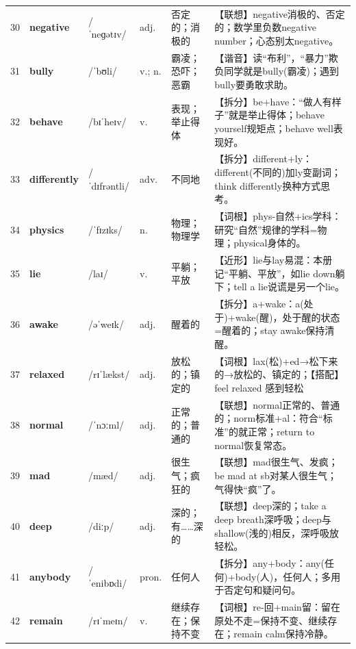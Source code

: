 \documentclass[UTF8,a4paper,11pt,oneside]{ctexbook}
\newcommand{\cellword}[1]{{\bfseries\textcolor{wordcol}{#1}}}
\newcommand{\cellipa}[1]{{\footnotesize\textcolor{ipacol}{#1}}}
\newcommand{\cellpos}[1]{\textcolor{poscol}{#1}}
\newcommand{\cellno}[1]{\textcolor{volcolor!75!black}{#1}}
\begin{document}
{\begin{longtable}{@{}C{0.045\textwidth}L{0.155\textwidth}L{0.175\textwidth}C{0.070\textwidth}L{0.180\textwidth}L{0.282\textwidth}@{}}
\cellno{30} & \cellword{negative} & \cellipa{/ˈneɡətɪv/} & \cellpos{adj.} & 否定的；消极的 & \textcolor{tagAssoc}{【联想】}negative消极的、否定的；数学里负数negative number；心态别太negative。 \\
 \cellno{31} & \cellword{bully} & \cellipa{/ˈbʊli/} & \cellpos{v.;\allowbreak{} n.} & 霸凌；恐吓；恶霸 & \textcolor{tagSound}{【谐音】}读“布利”，“暴力”欺负同学就是bully(霸凌)；遇到bully要勇敢求助。 \\
\cellno{32} & \cellword{behave} & \cellipa{/bɪˈheɪv/} & \cellpos{v.} & 表现；举止得体 & \textcolor{tagSplit}{【拆分】}be+have：“做人有样子”就是举止得体；behave yourself规矩点；behave well表现好。 \\
 \cellno{33} & \cellword{differently} & \cellipa{/ˈdɪfrəntli/} & \cellpos{adv.} & 不同地 & \textcolor{tagSplit}{【拆分】}different+ly：different(不同的)加ly变副词；think differently换种方式思考。 \\
\cellno{34} & \cellword{physics} & \cellipa{/ˈfɪzɪks/} & \cellpos{n.} & 物理；物理学 & \textcolor{tagRoot}{【词根】}phys-自然+ics学科：研究“自然”规律的学科=物理；physical身体的。 \\
 \cellno{35} & \cellword{lie} & \cellipa{/laɪ/} & \cellpos{v.} & 平躺；平放 & \textcolor{tagNear}{【近形】}lie与lay易混：本册记“平躺、平放”，如lie down躺下；tell a lie说谎是另一个lie。 \\
\cellno{36} & \cellword{awake} & \cellipa{/əˈweɪk/} & \cellpos{adj.} & 醒着的 & \textcolor{tagSplit}{【拆分】}a+wake：a(处于)+wake(醒)，处于醒的状态=醒着的；stay awake保持清醒。 \\
 \cellno{37} & \cellword{relaxed} & \cellipa{/rɪˈlækst/} & \cellpos{adj.} & 放松的；镇定的 & \textcolor{tagRoot}{【词根】}lax(松)+ed→\allowbreak{}松下来的→\allowbreak{}放松的、镇定的；\textcolor{tagColloc}{【搭配】}feel relaxed 感到轻松 \\
\cellno{38} & \cellword{normal} & \cellipa{/ˈnɔːml/} & \cellpos{adj.} & 正常的；普通的 & \textcolor{tagAssoc}{【联想】}normal正常的、普通的；norm标准+al：符合“标准”的就正常；return to normal恢复常态。 \\
 \cellno{39} & \cellword{mad} & \cellipa{/mæd/} & \cellpos{adj.} & 很生气；疯狂的 & \textcolor{tagAssoc}{【联想】}mad很生气、发疯；be mad at sb对某人很生气；气得快“疯”了。 \\
\cellno{40} & \cellword{deep} & \cellipa{/diːp/} & \cellpos{adj.} & 深的；有……深的 & \textcolor{tagAssoc}{【联想】}deep深的；take a deep breath深呼吸；deep与shallow(浅的)相反，深呼吸放轻松。 \\
 \cellno{41} & \cellword{anybody} & \cellipa{/ˈenibɒdi/} & \cellpos{pron.} & 任何人 & \textcolor{tagSplit}{【拆分】}any+body：any(任何)+body(人)，任何人；多用于否定句和疑问句。 \\
\cellno{42} & \cellword{remain} & \cellipa{/rɪˈmeɪn/} & \cellpos{v.} & 继续存在；保持不变 & \textcolor{tagRoot}{【词根】}re-回+main留：留在原处不走=保持不变、继续存在；remain calm保持冷静。 \\
\end{longtable}
}
\end{document}
